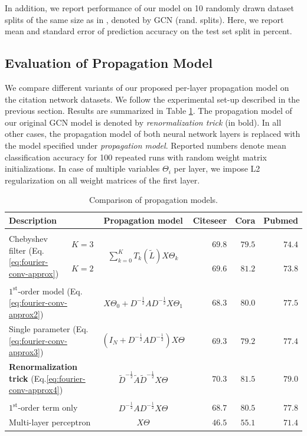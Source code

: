 \documentclass{article} %
\makeatletter
\newcommand*{\eq}{Eq.\@\xspace}
\makeatother
\begin{document}
In addition, we report performance of our model on 10 randomly drawn dataset splits of the same size as in \cite{yang2016revisiting}, denoted by GCN (rand.\@\xspace splits). Here, we report mean and standard error of prediction accuracy on the test set split in percent.

\subsection{Evaluation of Propagation Model}
We compare different variants of our proposed per-layer propagation model on the citation network datasets. We follow the experimental set-up described in the previous section. Results are summarized in Table \ref{tab:results_model_eval}. The propagation model of our original GCN model is denoted by \textit{renormalization trick} (in bold). In all other cases, the propagation model of both neural network layers is replaced with the model specified under \textit{propagation model}. Reported numbers denote mean classification accuracy for 100 repeated runs with random weight matrix initializations. In case of multiple variables $\Theta_i$ per layer, we impose L2 regularization on all weight matrices of the first layer.

\begin{table}[htp]
\centering
\caption{\label{tab:results_model_eval}Comparison of propagation models.}
\begin{tabular}{l c c r r r}
\textbf{Description} & & \textbf{Propagation model} & \textbf{Citeseer} & \textbf{Cora} & \textbf{Pubmed} \\[0.05em]\hline \\[-0.8em]

\multirow{2}{*}{Chebyshev filter (\eq \ref{eq:fourier-conv-approx})} & $K=3$  & \multirow{2}{*}{$\sum_{k=0}^K  T_k(\tilde{L}) X \Theta_k$} & $69.8$& $79.5$ & $74.4$    \\
  & $K=2$ &  & $69.6$& $81.2$ & $73.8$    \\[0.05em]\hline \\[-0.9em]
\multicolumn{2}{l}{$1^{\text{st}}$-order model (\eq \ref{eq:fourier-conv-approx2})}  & $X\Theta_0 + D^{-\frac{1}{2}}AD^{-\frac{1}{2}}X\Theta_1$ & $68.3$& $80.0$ & $77.5$ \\
\multicolumn{2}{l}{Single parameter (\eq \ref{eq:fourier-conv-approx3})} & $(I_N + D^{-\frac{1}{2}}AD^{-\frac{1}{2}})X\Theta$ & $69.3$& $79.2$ & $77.4$ \\
\multicolumn{2}{l}{\textbf{Renormalization trick} (\eq \ref{eq:fourier-conv-approx4})}& $\tilde{D}^{-\frac{1}{2}}\tilde{A}\tilde{D}^{-\frac{1}{2}}X\Theta$ & $\mathbf{70.3}$ & $\mathbf{81.5}$ & $\mathbf{79.0}$   \\[0.25em]\hline \\[-0.9em]
\multicolumn{2}{l}{$1^{\text{st}}$-order term only}
 & $D^{-\frac{1}{2}}AD^{-\frac{1}{2}}X\Theta$ & $68.7$ & $80.5$ & $77.8$ \\
\multicolumn{2}{l}{Multi-layer perceptron} & $X\Theta$ & $46.5$ & $55.1$ & $71.4$ \\
\end{tabular}
\end{table}
\end{document}
